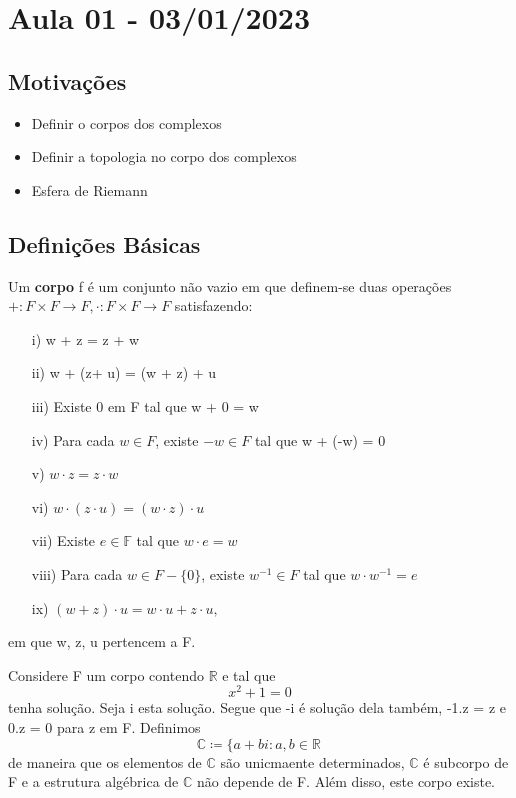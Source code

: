 \documentclass[ComplexAnalysis/complex.tex]{subfiles}
\begin{document}
\section{Aula 01 - 03/01/2023}
\subsection{Motivações}
\begin{itemize}
	\item Definir o corpos dos complexos
	\item Definir a topologia no corpo dos complexos
	\item Esfera de Riemann
\end{itemize}

\subsection{Definições Básicas}
\begin{def*}
	Um \textbf{corpo} f é um conjunto não vazio em que definem-se duas operações $+:F\times{F}\rightarrow F, \cdot:F\times{F}\rightarrow F$ satisfazendo:
	\begin{itemize}
		\item[i)] w + z = z + w
		\item[ii)] w + (z+ u) = (w + z) + u
		\item[iii)] Existe 0 em F tal que w + 0 = w
		\item[iv)] Para cada $w\in F$, existe $-w \in F$ tal que w + (-w) = 0
		\item[v)] $w\cdot z = z\cdot w$
		\item[vi)] $w\cdot(z\cdot u) = (w\cdot z)\cdot u$
		\item[vii)] Existe $e\in \mathbb{F}$ tal que $w\cdot{e} = w$
		\item[viii)] Para cada $w\in{F-\{0\}}$, existe $w ^{-1}\in{F}$ tal que $w\cdot w ^{-1} = e$
		\item[ix)] $(w+z)\cdot{u} = w\cdot u + z\cdot u,$
	\end{itemize}
	em que w, z, u pertencem a F.
\end{def*}
Considere F um corpo contendo $\mathbb{R}$ e tal que
$$
	x ^{2} + 1 = 0
$$
tenha solução. Seja i esta solução. Segue que -i é solução dela também, -1.z = z e 0.z = 0 para z em F. Definimos
$$
	\mathbb{C}\coloneqq  \{a + bi: a, b\in \mathbb{R}\,
$$
de maneira que os elementos de $\mathbb{C}$ são unicmaente determinados, $\mathbb{C}$ é subcorpo de F e a estrutura
algébrica de $\mathbb{C}$ não depende de F. Além disso, este corpo existe.
\end{document}

